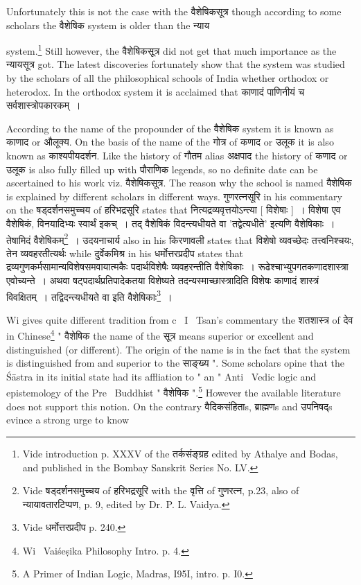 \documentclass[11pt, openany]{book}
\begin{document}
Unfortunately this is not the case with the वैशेषिकसूत्र though according to some scholars the वैशेषिक system is older than the न्याय

\newpage
\noindent
system.\renewcommand{\thefootnote}{1}\footnote{Vide introduction p. XXXV of the तर्कसंङ्ग्रह edited by Athalye and Bodas, and published in the Bombay Sanskrit Series No. LV.} Still however, the वैशेषिकसूत्र did not get that much importance as the न्यायसूत्र got. The latest discoveries fortunately show that the system was studied by the scholars of all the philosophical schools of India whether orthodox or heterodox. In the orthodox system it is acclaimed that काणादं पाणिनीयं च सर्वशास्त्रोपकारकम्~।

\noindent
According to the name of the propounder of the वैशेषिक system it is known as काणाद or औलूक्य. On the basis of the name of the गोत्र of कणाद or उलूक it is also known as काश्यपीयदर्शन. Like the history of गौतम alias अक्षपाद the history of कणाद or उलूक is also fully filled up with पौराणिक legends, so no definite date can be ascertained to his work viz. वैशेषिकसूत्र. The reason why the school is named वैशेषिक is explained by different scholars in different ways. गुणरत्नसूरि in his commentary on the षड्दर्शनसमुच्चय of हरिभद्रसूरि states that नित्यद्रव्यवृत्तयोऽन्त्या [ विशेषाः ]~। विशेषा एव वैशेषिकं, विनयादिभ्यः स्वार्थं इकच्~। तद् वैशेषिकं विदन्त्यधीयते वा 'तद्वेत्यधीते' इत्यणि वैशेषिकाः~। तेषामिदं वैशेषिकम्\renewcommand{\thefootnote}{2}\footnote{Vide षड्दर्शनसमुच्चय of हरिभद्रसूरि with the वृत्ति of गुणरत्न, p.23, also of न्यायावतारटिप्पण, p. 9, edited by Dr. P. L. Vaidya.}~। उदयनाचार्य also in his किरणावली states that विशेषो व्यवच्छेदः तत्त्वनिश्चयः, तेन व्यवहरतीत्यर्थः while दुर्वेकमिश्र in his धर्मोत्तरप्रदीप states that द्रव्यगुणकर्मसामान्यविशेषसमवायात्मकैः पदार्थविशेषैः व्यवहरन्तीति वैशेषिकाः~। रूढेश्चाभ्युपगतकणादशास्त्रा एवोच्यन्ते~। अथवा षट्पदार्थप्रतिपादेकतया विशेष्यते तदन्यस्माच्छास्त्रादिति विशेषः काणादं शास्त्रं विवक्षितम्~। तद्विदन्त्यधीयते वा इति वैशेषिकाः\renewcommand{\thefootnote}{3}\footnote{Vide धर्मोत्तरप्रदीप p. 240.}~।

Wi gives quite different tradition from c \textendash\ I \textendash\ Tsan's commentary the शतशास्त्र of देव in Chinese\renewcommand{\thefootnote}{4}\footnote{Wi \textendash\ Vaiśeṣika Philosophy Intro. p. 4.} " वैशेषिक the name of the सूत्र means superior or excellent and distinguished (or different). The origin of the name is in the fact that the system is distinguished from and superior to the साङ्ख्य ". Some scholars opine that the Śāstra in its initial state had its affliation to " an " Anti \textendash\ Vedic logic and epistemology of the Pre \textendash\ Buddhist " वैशेषिक ".\renewcommand{\thefootnote}{5}\footnote{A Primer of Indian Logic, Madras, I95I, intro. p. I0.} However the available literature does not support this notion. On the contrary वैदिकसंहिताs, ब्राह्मणs and उपनिषद्s evince a strong urge to know
\end{document}
